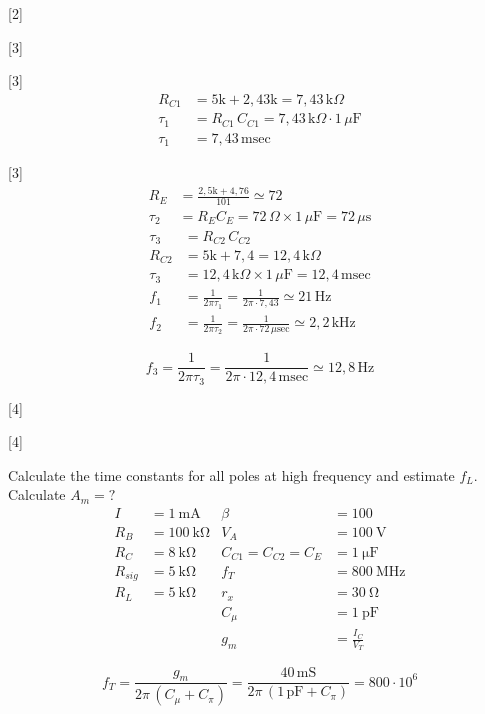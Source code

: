 \documentclass[11pt,a4paper]{article}
\begin{document}
[2]

[3]

[3]
\begin{align*}
R_{C1} &= 5\mathrm{k} + 2{,}43\mathrm{k} = 7{,}43\,\mathrm{k}\Omega\\
\tau_1 &= R_{C1}\,C_{C1} = 7{,}43\,\mathrm{k}\Omega\cdot 1\,\mu\mathrm{F}\\
\tau_1 &= 7{,}43\,\mathrm{msec}
\end{align*}

[3]
\begin{align*}
R_E &= \frac{2{,}5\mathrm{k} + 4{,}76}{101} \simeq 72\\
\tau_2 &= R_E C_E = 72\,\Omega \times 1\,\mu\mathrm{F} = 72\,\mu\mathrm{s}
\end{align*}
\begin{align*}
\tau_3 &= R_{C2}\,C_{C2}\\
R_{C2} &= 5\mathrm{k} + 7{,}4 = 12{,}4\,\mathrm{k}\Omega\\
\tau_3 &= 12{,}4\,\mathrm{k}\Omega \times 1\,\mu\mathrm{F} = 12{,}4\,\mathrm{msec}\\
f_1 &= \frac{1}{2\pi\tau_1} = \frac{1}{2\pi\cdot 7{,}43} \simeq 21\,\mathrm{Hz}\\
f_2 &= \frac{1}{2\pi\tau_2} = \frac{1}{2\pi\cdot 72\,\mu\mathrm{sec}} \simeq 2{,}2\,\mathrm{kHz}
\end{align*}

\[ f_3 = \frac{1}{2\pi\tau_3} = \frac{1}{2\pi\cdot 12{,}4\,\mathrm{msec}} \simeq 12{,}8\,\mathrm{Hz} \]

[4]

[4]

\begin{ornek}
Calculate the time constants for all poles at high frequency and estimate $f_L$. Calculate $A_m = ?$
\[
\begin{aligned}
I &= \qty{1}{\milli\ampere} & \beta &= 100\\
R_B &= \qty{100}{\kilo\ohm} & V_A &= \qty{100}{\volt}\\
R_C &= \qty{8}{\kilo\ohm} & C_{C1} = C_{C2} = C_E &= \qty{1}{\micro\farad}\\
R_{sig} &= \qty{5}{\kilo\ohm} & f_T &= \qty{800}{\mega\hertz}\\
R_L &= \qty{5}{\kilo\ohm} & r_x &= \qty{30}{\ohm}\\
 & & C_\mu &= \qty{1}{\pico\farad}\\
 & & g_m &= \frac{I_C}{V_T}
\end{aligned}
\]
\end{ornek}
\[ f_T = \frac{g_m}{2\pi\,(C_\mu + C_\pi)} = \frac{40\,\mathrm{mS}}{2\pi\,(1\,\mathrm{pF} + C_\pi)} = 800\cdot 10^{6} \]
\end{document}

